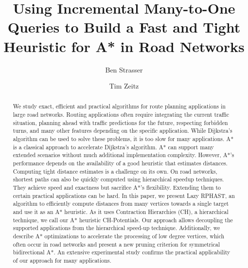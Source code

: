 \documentclass[manuscript,review]{acmart}
\begin{document}
\title{Using Incremental Many-to-One Queries to Build a Fast and Tight Heuristic for A* in Road Networks}

\author{Ben Strasser}

\author{Tim Zeitz}


\renewcommand{\shortauthors}{B. Strasser and T. Zeitz}


\begin{abstract}
We study exact, efficient and practical algorithms for route planning applications in large road networks.
Routing applications often require integrating the current traffic situation, planning ahead with traffic predictions for the future, respecting forbidden turns, and many other features depending on the specific application.
While Dijkstra's algorithm can be used to solve these problems, it is too slow for many applications.
A* is a classical approach to accelerate Dijkstra's algorithm.
A* can support many extended scenarios without much additional implementation complexity.
However, A*'s performance depends on the availability of a good heuristic that estimates distances.
Computing tight distance estimates is a challenge on its own.
On road networks, shortest paths can also be quickly computed using hierarchical speedup techniques.
They achieve speed and exactness but sacrifice A*'s flexibility.
Extending them to certain practical applications can be hard.
In this paper, we present Lazy RPHAST, an algorithm to efficiently compute distances from many vertices towards a single target and use it as an A* heuristic.
As it uses Contraction Hierarchies (CH), a hierarchical technique, we call our A* heuristic CH-Potentials.
Our approach allows decoupling the supported applications from the hierarchical speed-up technique.
Additionally, we describe A* optimizations to accelerate the processing of low degree vertices, which often occur in road networks and present a new pruning criterion for symmetrical bidirectional A*.
An extensive experimental study confirms the practical applicability of our approach for many applications.
\end{abstract}
\end{document}
